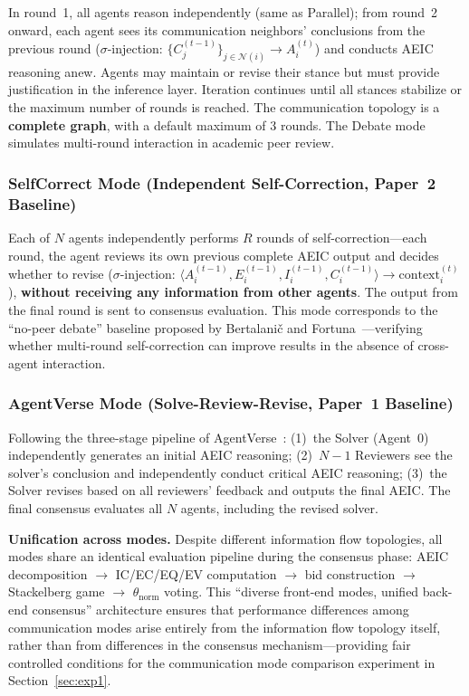 \documentclass[12pt,a4paper]{article}
\begin{document}
In round~1, all agents reason independently (same as Parallel); from round~2 onward, each agent sees its communication neighbors' conclusions from the previous round ($\sigma$-injection: $\{C_j^{(t-1)}\}_{j \in \mathcal{N}(i)} \to A_i^{(t)}$) and conducts AEIC reasoning anew. Agents may maintain or revise their stance but must provide justification in the inference layer. Iteration continues until all stances stabilize or the maximum number of rounds is reached. The communication topology is a \textbf{complete graph}, with a default maximum of 3 rounds. The Debate mode simulates multi-round interaction in academic peer review.

\subsubsection{SelfCorrect Mode (Independent Self-Correction, Paper~2 Baseline)}

Each of $N$ agents independently performs $R$ rounds of self-correction---each round, the agent reviews its own previous complete AEIC output and decides whether to revise ($\sigma$-injection: $\langle A_i^{(t-1)}, E_i^{(t-1)}, I_i^{(t-1)}, C_i^{(t-1)} \rangle \to \text{context}_i^{(t)}$), \textbf{without receiving any information from other agents}. The output from the final round is sent to consensus evaluation. This mode corresponds to the ``no-peer debate'' baseline proposed by Bertalani\v{c} and Fortuna~\cite{bertalanic2026cost}---verifying whether multi-round self-correction can improve results in the absence of cross-agent interaction.

\subsubsection{AgentVerse Mode (Solve-Review-Revise, Paper~1 Baseline)}

Following the three-stage pipeline of AgentVerse~\cite{chen2023agentverse}: (1)~the Solver (Agent~0) independently generates an initial AEIC reasoning; (2)~$N-1$ Reviewers see the solver's conclusion and independently conduct critical AEIC reasoning; (3)~the Solver revises based on all reviewers' feedback and outputs the final AEIC. The final consensus evaluates all $N$ agents, including the revised solver.

\textbf{Unification across modes.} Despite different information flow topologies, all modes share an identical evaluation pipeline during the consensus phase: AEIC decomposition $\to$ IC/EC/EQ/EV computation $\to$ bid construction $\to$ Stackelberg game $\to$ $\theta_{\text{norm}}$ voting. This ``diverse front-end modes, unified back-end consensus'' architecture ensures that performance differences among communication modes arise entirely from the information flow topology itself, rather than from differences in the consensus mechanism---providing fair controlled conditions for the communication mode comparison experiment in Section~\ref{sec:exp1}.
\end{document}
